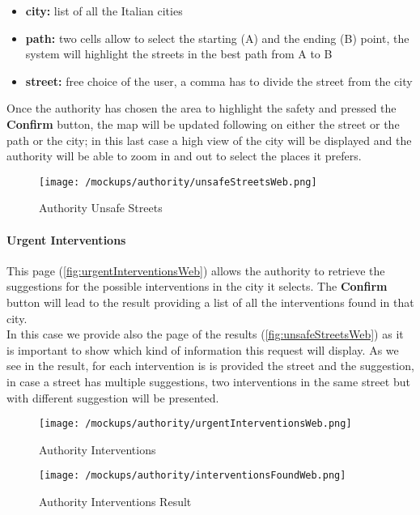 				\begin{itemize}
					\item \textbf{city:} list of all the Italian cities
					\item \textbf{path:} two cells allow to select the starting (A) and the ending (B) point, the system will highlight the streets in the best path from A to B
					\item \textbf{street:} free choice of the user, a comma has to divide the street from the city
				\end{itemize}
				
				Once the authority has chosen the area to highlight the safety and pressed the \textbf{Confirm} button, the map will be updated following on either the street or the path or the city; in this last case a high view of the city will be displayed and the authority will be able to zoom in and out to select the places it prefers.
				
				\vspace{0.6cm}
					
				\begin{figure}[ht!]
					\centering
					\texttt{[image: /mockups/authority/unsafeStreetsWeb.png]}
					\caption{\label{fig:unsafeStreetsWeb} Authority Unsafe Streets}
				\end{figure}
			
				\paragraph{Urgent Interventions}
				This page (\autoref{fig:urgentInterventionsWeb}) allows the authority to retrieve the suggestions for the possible interventions in the city it selects. The \textbf{Confirm} button will lead to the result providing a list of all the interventions found in that city.\\
				
				In this case we provide also the page of the results (\autoref{fig:unsafeStreetsWeb}) as it is important to show which kind of information this request will display. As we see in the result, for each intervention is is provided the street and the suggestion, in case a street has multiple suggestions, two interventions in the same street but with different suggestion will be presented.
				
				\vspace{0.4cm}				
				
				\begin{figure}[ht!]
					\centering
					\texttt{[image: /mockups/authority/urgentInterventionsWeb.png]}
					\caption{\label{fig:urgentInterventionsWeb} Authority Interventions}
				\end{figure}
			
				\begin{figure}[ht!]
					\centering
					\texttt{[image: /mockups/authority/interventionsFoundWeb.png]}
					\caption{\label{fig:interventionsFoundWeb} Authority Interventions Result}
				\end{figure}